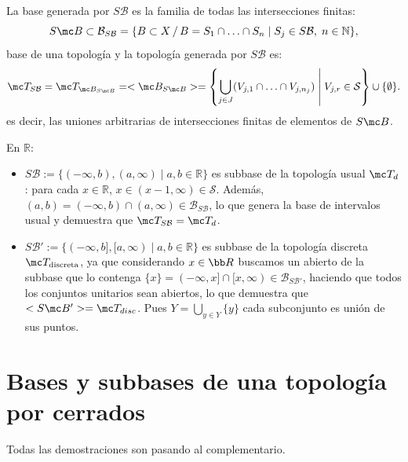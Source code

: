 La base generada por \(S\mathcal{B}\) es la familia de todas las intersecciones finitas:
\[
    S\mc B \subset \mathcal{B}_{S\mathcal{B}} = \{B\subset X \, / \, B=S_1 \cap \ldots \cap S_n \mid S_j \in S\mathcal{B}, \; n \in \mathbb{N}\} \text{},
\]
base de una topolog\'ia y la topología generada por \(S\mathcal{B}\) es:
\[
    \mc T_{S\mathcal{B}}  = \mc T_{\mc B_{S\mc B}} = <\mc B_{S\mc B}> = \left\{\bigcup_{j \in J} (V_{j, 1} \cap \ldots \cap V_{j, n_j}) \;\middle|\; V_{j, r} \in \mathcal{S}\right\} \cup \{\emptyset\} \text{}.
\] es decir, las uniones arbitrarias de intersecciones finitas de elementos de $S\mc B$. 

\begin{ejem}
En \(\mathbb{R}\):
\begin{itemize}
    \item \(S\mathcal{B} := \{(-\infty, b), (a, \infty) \mid a, b \in \mathbb{R}\}\) es subbase de la topología usual \(\mc T_d\): para cada \(x \in \mathbb{R}\), \(x \in (x - 1, \infty) \in \mathcal{S}\). Además, \((a, b) = (-\infty, b) \cap (a, \infty) \in \mathcal{B}_{S\mathcal{B}}\), lo que genera la base de intervalos usual y demuestra que \(\mc T_{S\mathcal{B}} = \mc T_d\).
    \item \(S\mathcal{B}' := \{(-\infty, b], [a, \infty) \mid a, b \in \mathbb{R}\}\) es subbase de la topología discreta \(\mc T_{\text{discreta}}\), ya que considerando $x \in \bb R$ buscamos un abierto de la subbase que lo contenga \(\{x\} = (-\infty, x] \cap [x, \infty) \in \mathcal{B}_{S\mathcal{B}'}\), haciendo que todos los conjuntos unitarios sean abiertos, lo que demuestra que $<S\mc B'>= \mc T_{disc}$. Pues $Y = \displaystyle \bigcup_{y\in Y} \{y\}$ cada subconjunto es uni\'on de sus puntos.
\end{itemize}
\end{ejem}

\section{Bases y subbases de una topolog\'ia por cerrados}
Todas las demostraciones son pasando al complementario.

